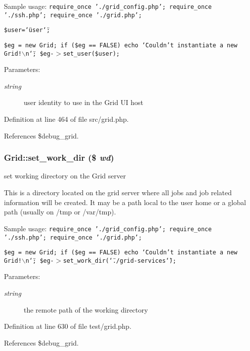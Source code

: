 Sample usage: {\tt  require\_\-once './grid\_\-config.php'; require\_\-once './ssh.php'; require\_\-once './grid.php';}

{\tt  \$user=\char`\"{}user\char`\"{};}

{\tt  \$eg = new Grid; if (\$eg == FALSE) echo \char`\"{}Couldn't instantiate a new Grid!$\backslash$n\char`\"{}; \$eg-$>$set\_\-user(\$user); }

\begin{Desc}
\item[Parameters:]
\begin{description}
\item[{\em string}]user identity to use in the Grid UI host \end{description}
\end{Desc}


Definition at line 464 of file src/grid.php.

References \$debug\_\-grid.
\subsubsection{\setlength{\rightskip}{0pt plus 5cm}Grid::set\_\-work\_\-dir (\$ {\em wd})}\label{classGrid_a32}


set working directory on the Grid server 

This is a directory located on the grid server where all jobs and job related information will be created. It may be a path local to the user home or a global path (usually on /tmp or /var/tmp).

Sample usage: {\tt  require\_\-once './grid\_\-config.php'; require\_\-once './ssh.php'; require\_\-once './grid.php';}

{\tt  \$eg = new Grid; if (\$eg == FALSE) echo \char`\"{}Couldn't instantiate a new Grid!$\backslash$n\char`\"{}; \$eg-$>$set\_\-work\_\-dir(\char`\"{}./grid-services\char`\"{}); }

\begin{Desc}
\item[Parameters:]
\begin{description}
\item[{\em string}]the remote path of the working directory \end{description}
\end{Desc}


Definition at line 630 of file test/grid.php.

References \$debug\_\-grid.
